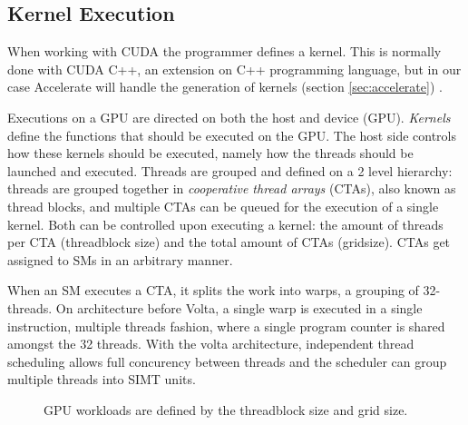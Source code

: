 \subsection{Kernel Execution}
\label{sec:kernel_execution}
When working with CUDA the programmer defines a kernel.
This is normally done with CUDA C++, an extension on C++ programming language, but in our case Accelerate will handle the generation of kernels (section \ref{sec:accelerate}) \cite{nvidia2021cudadocs}.

Executions on a GPU are directed on both the host and device (GPU).
\textit{Kernels} define the functions that should be executed on the GPU.
The host side controls how these kernels should be executed, namely how the threads should be launched and executed.
Threads are grouped and defined on a 2 level hierarchy: threads are grouped together in \textit{cooperative thread arrays} (CTAs), also known as thread blocks, and multiple CTAs can be queued for the execution of a single kernel.
Both can be controlled upon executing a kernel: the amount of threads per CTA (threadblock size) and the total amount of CTAs (gridsize).
CTAs get assigned to SMs in an arbitrary manner.

When an SM executes a CTA, it splits the work into warps, a grouping of 32-threads.
On architecture before Volta, a single warp is executed in a single instruction, multiple threads fashion, where a single program counter is shared amongst the 32 threads.
With the volta architecture, independent thread scheduling allows full concurency between threads and the scheduler can group multiple threads into SIMT units.





\begin{figure}[!hb]
    \centering
    \caption{
        GPU workloads are defined by the threadblock size and grid size.
    }
\end{figure}

